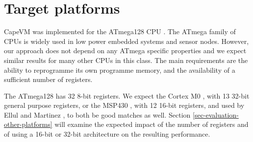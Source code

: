 \section{Target platforms}
CapeVM was implemented for the ATmega128 CPU \cite{Atmel:ATmega128Datasheet}. The ATmega family of CPUs is widely used in low power embedded systems and sensor nodes. However, our approach does not depend on any ATmega specific properties and we expect similar results for many other CPUs in this class. The main requirements are the ability to reprogramme its own programme memory, and the availability of a sufficient number of registers.

The ATmega128 has 32 8-bit registers. We expect the Cortex M0 \cite{ARM:2009vz}, with 13 32-bit general purpose registers, or the MSP430 \cite{TexasInstrumentsIncorporated:MSP430F1611Datasheet}, with 12 16-bit registers, and used by Ellul and Martinez \cite{Ellul:2010iw}, to both be good matches as well. Section \ref{sec-evaluation-other-platforms} will examine the expected impact of the number of registers and of using a 16-bit or 32-bit architecture on the resulting performance.
